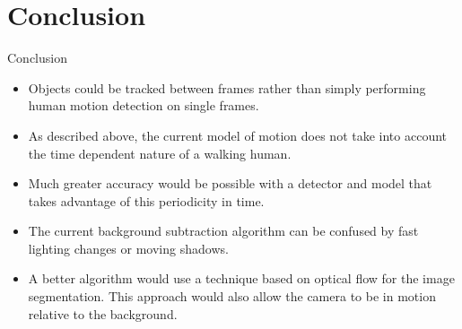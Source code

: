 \documentclass{beamer}
\begin{document}
\section{Conclusion}
\begin{frame}{Conclusion}
\begin{itemize}
\item Objects could be tracked between frames rather than simply performing human motion detection on single frames.
\item As described above, the current model of motion does not take into account the time dependent nature of a walking human.
\item Much greater accuracy would be possible with a detector and model that takes advantage of this periodicity in time.
\item The current background subtraction algorithm can be confused by fast lighting changes or moving shadows. 
\item A better algorithm would use a technique based on optical flow for the image segmentation. This approach would also allow the camera to be in motion relative to the background.
\end{itemize}
\end{frame}
\end{document}
